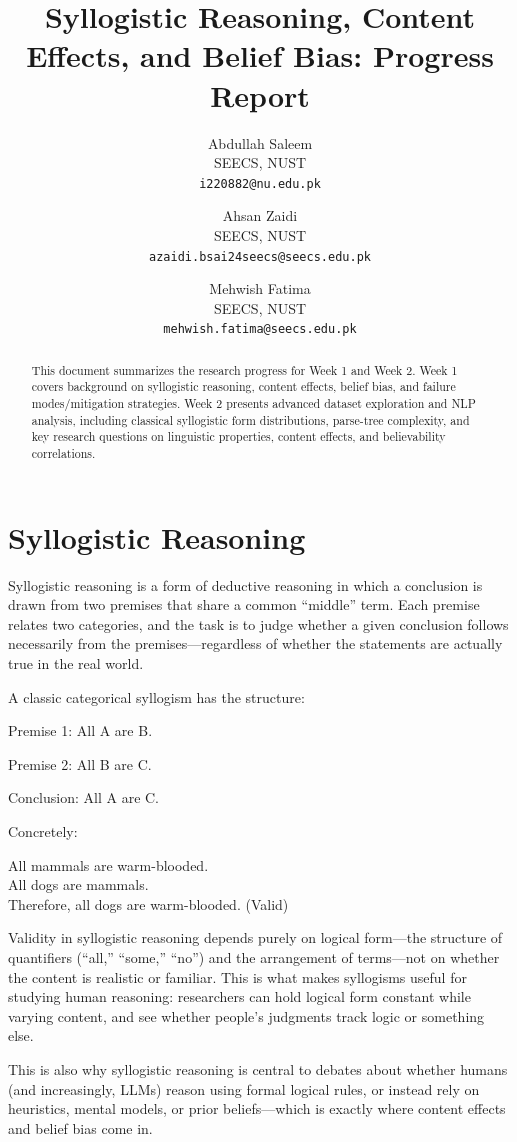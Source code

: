 \documentclass[11pt]{article}
\title{Syllogistic Reasoning, Content Effects, and Belief Bias: Progress Report}
\author{Abdullah Saleem \\
	SEECS, NUST \\
	\texttt{i220882@nu.edu.pk}
	\and
	Ahsan Zaidi \\
	SEECS, NUST \\
	\texttt{azaidi.bsai24seecs@seecs.edu.pk}
	\and
	Mehwish Fatima \\
	SEECS, NUST \\
	\texttt{mehwish.fatima@seecs.edu.pk}}
\date{}
\begin{document}
\maketitle

\begin{abstract}
This document summarizes the research progress for Week 1 and Week 2. Week 1 covers background on syllogistic reasoning, content effects, belief bias, and failure modes/mitigation strategies. Week 2 presents advanced dataset exploration and NLP analysis, including classical syllogistic form distributions, parse-tree complexity, and key research questions on linguistic properties, content effects, and believability correlations.
\end{abstract}

\section{Syllogistic Reasoning}

Syllogistic reasoning is a form of deductive reasoning in which a conclusion is drawn from two premises that share a common ``middle'' term. Each premise relates two categories, and the task is to judge whether a given conclusion follows necessarily from the premises---regardless of whether the statements are actually true in the real world.

A classic categorical syllogism has the structure:

Premise 1: All A are B.

Premise 2: All B are C.

Conclusion: All A are C.

Concretely:

All mammals are warm-blooded. \\
All dogs are mammals. \\
Therefore, all dogs are warm-blooded. (Valid)

Validity in syllogistic reasoning depends purely on logical form---the structure of quantifiers (``all,'' ``some,'' ``no'') and the arrangement of terms---not on whether the content is realistic or familiar. This is what makes syllogisms useful for studying human reasoning: researchers can hold logical form constant while varying content, and see whether people's judgments track logic or something else.

This is also why syllogistic reasoning is central to debates about whether humans (and increasingly, LLMs) reason using formal logical rules, or instead rely on heuristics, mental models, or prior beliefs---which is exactly where content effects and belief bias come in.
\end{document}
